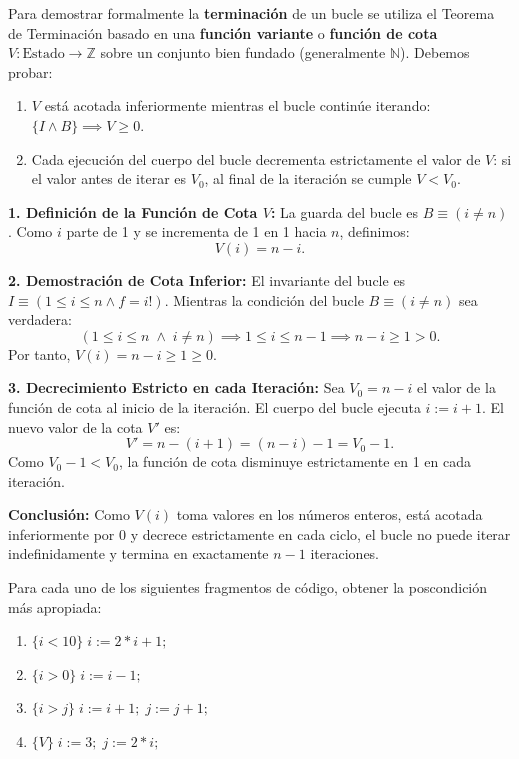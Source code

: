 \begin{solucion}
Para demostrar formalmente la \textbf{terminación} de un bucle se utiliza el Teorema de Terminación basado en una \textbf{función variante} o \textbf{función de cota} $V : \text{Estado} \to \mathbb{Z}$ sobre un conjunto bien fundado (generalmente $\mathbb{N}$).
Debemos probar:
\begin{enumerate}
    \item $V$ está acotada inferiormente mientras el bucle continúe iterando: $\{I \land B\} \implies V \ge 0$.
    \item Cada ejecución del cuerpo del bucle decrementa estrictamente el valor de $V$: si el valor antes de iterar es $V_0$, al final de la iteración se cumple $V < V_0$.
\end{enumerate}

\textbf{1. Definición de la Función de Cota $V$:}
La guarda del bucle es $B \equiv (i \neq n)$. Como $i$ parte de 1 y se incrementa de 1 en 1 hacia $n$, definimos:
\[
V(i) = n - i.
\]

\textbf{2. Demostración de Cota Inferior:}
El invariante del bucle es $I \equiv (1 \le i \le n \land f = i!)$.
Mientras la condición del bucle $B \equiv (i \neq n)$ sea verdadera:
\[
(1 \le i \le n \;\land\; i \neq n) \implies 1 \le i \le n - 1 \implies n - i \ge 1 > 0.
\]
Por tanto, $V(i) = n - i \ge 1 \ge 0$.

\textbf{3. Decrecimiento Estricto en cada Iteración:}
Sea $V_0 = n - i$ el valor de la función de cota al inicio de la iteración.
El cuerpo del bucle ejecuta $i := i + 1$. El nuevo valor de la cota $V'$ es:
\[
V' = n - (i + 1) = (n - i) - 1 = V_0 - 1.
\]
Como $V_0 - 1 < V_0$, la función de cota disminuye estrictamente en 1 en cada iteración.

\textbf{Conclusión:} Como $V(i)$ toma valores en los números enteros, está acotada inferiormente por 0 y decrece estrictamente en cada ciclo, el bucle no puede iterar indefinidamente y termina en exactamente $n - 1$ iteraciones.
\end{solucion}

\begin{ejercicio}
Para cada uno de los siguientes fragmentos de código, obtener la poscondición más apropiada:
\begin{enumerate}[label=(\alph*),leftmargin=*]
    \item $\{i < 10\} \; i := 2 * i + 1;$
    \item $\{i > 0\} \; i := i - 1;$
    \item $\{i > j\} \; i := i + 1; \; j := j + 1;$
    \item $\{V\} \; i := 3; \; j := 2 * i;$
\end{enumerate}
\end{ejercicio}

